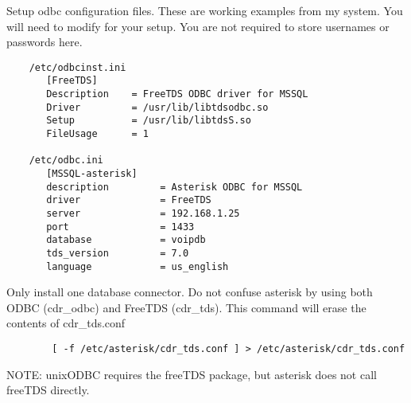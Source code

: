 	Setup odbc configuration files.  These are working examples
	from my system.  You will need to modify for your setup.
	You are not required to store usernames or passwords here.
\begin{astlisting}
\begin{verbatim}
	/etc/odbcinst.ini
	   [FreeTDS]
	   Description    = FreeTDS ODBC driver for MSSQL
	   Driver         = /usr/lib/libtdsodbc.so
	   Setup          = /usr/lib/libtdsS.so
	   FileUsage      = 1

	/etc/odbc.ini
	   [MSSQL-asterisk]
	   description         = Asterisk ODBC for MSSQL
	   driver              = FreeTDS
	   server              = 192.168.1.25
	   port                = 1433
	   database            = voipdb
	   tds_version         = 7.0
	   language            = us_english
\end{verbatim}
\end{astlisting}

		Only install one database connector.  Do not confuse asterisk
		by using both ODBC (cdr_odbc) and FreeTDS (cdr_tds).
		This command will erase the contents of cdr_tds.conf
\begin{astlisting}
\begin{verbatim}
		[ -f /etc/asterisk/cdr_tds.conf ] > /etc/asterisk/cdr_tds.conf
\end{verbatim}
\end{astlisting}
		NOTE:  unixODBC requires the freeTDS package, but asterisk does
		not call freeTDS directly.

